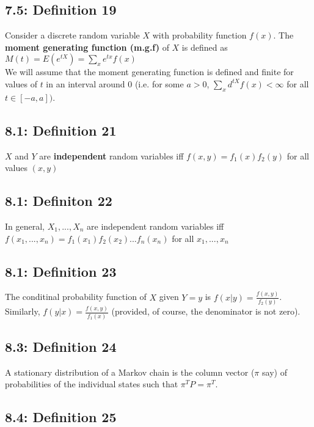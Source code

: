 \documentclass[11pt]{article}
\begin{document}
	 \subsection*{7.5: Definition 19}
	 	Consider a discrete random variable $X$ with probability function $f(x)$. The {\bf moment generating function (m.g.f)} of $X$ is defined as\\
	 	$ M(t)=E(e^{tX})=\sum_xe^{tx}f(x)$\\
	 	We will assume that the moment generating function is defined and finite for values of $t$ in an interval around 0 (i.e. for some $a>0$, $\sum_xd^{tX}f(x)<\infty$ for all $t \in [-a,a])$.
	
	 	
	 
	\subsection*{8.1: Definition 21}
	
		$X$ and $Y$ are {\bf independent} random variables iff $f(x,y)  = f_1(x)f_2(y)$ for all values $(x,y)$	
		
	\subsection*{8.1: Definiton 22}
		In general, $X_1,...,X_n$ are independent random variables iff\\
		$f(x_1,...,x_n)=f_1(x_1)f_2(x_2)...f_n(x_n)$ for all $x_1,...,x_n$
		
	\subsection*{8.1: Definition 23}
		The conditinal probability function of $X$ given $Y=y$ is $f(x|y)=\frac{f(x,y)}{f_2(y)}$.\\
		Similarly, $f(y|x)=\frac{f(x,y)}{f_1(x)}$ (provided, of course, the denominator is not zero).
		
	\subsection*{8.3: Definition 24}
		A stationary distribution of a Markov chain is the column vector ($\pi$ say) of probabilities of the individual states such that $\pi^TP=\pi^T$.	
		
	\subsection*{8.4: Definition 25}
	
\end{document}
